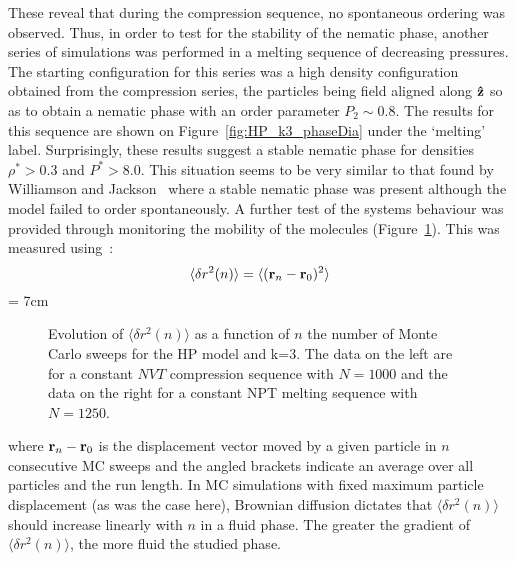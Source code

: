 These reveal that during the compression sequence, no spontaneous ordering was observed.
Thus, in order to test for the stability of the nematic phase, another series of simulations was
performed in a melting sequence of decreasing pressures. The starting configuration for this series 
was a high density configuration obtained from the compression series, the particles being field
aligned along $\mathbf{\hat{z} }$ so as to obtain a nematic phase with an order parameter 
$P_2\sim 0.8$. The results for this sequence are shown on  Figure~\ref{fig:HP_k3_phaseDia} 
under the `melting' label. Surprisingly, these results suggest a
stable nematic phase for densities $\rho^{*} > 0.3$ and $P^{*}>8.0$. This situation seems to
be very similar to that found by Williamson and Jackson~\cite{WilliamsonJackson98} 
where a stable nematic phase was present although the model failed to order spontaneously.
A further test of the systems behaviour was provided through monitoring the mobility of the molecules
(Figure~\ref{fig:HP_k3_dc}). This was measured using~:
\begin{equation}
	\langle\delta r^2(n)\rangle  = \langle({\bf r}_n - {\bf r}_0)^2\rangle 
\end{equation}
%
\picW = 7cm
\begin{figure}
	\centering
	\caption[Evolution of $\langle\delta r^2(n)\rangle$ as a function of $n$ the number of
	Monte Carlo sweeps for the HP model and k=3.]
	{Evolution of $\langle\delta r^2(n)\rangle$ as a function of $n$ the number of
	Monte Carlo sweeps for the HP model and k=3. The data
	on the left are for a constant $NVT$ compression sequence with $N=1000$ and the data on
	the right for a constant NPT melting sequence with $N=1250$.}
	\label{fig:HP_k3_dc}
\end{figure}
%
where ${\bf r}_n - {\bf r}_0$ is the displacement vector moved by a given particle in $n$ 
consecutive MC
sweeps and the angled brackets indicate an average over all particles and the run length. In MC 
simulations with fixed maximum particle displacement (as was the case here), Brownian diffusion 
dictates that  $\langle\delta r^2(n)\rangle$ should increase linearly with $n$ in a fluid phase.
The greater the gradient of $\langle\delta r^2(n)\rangle$, the more fluid the studied phase.\\

